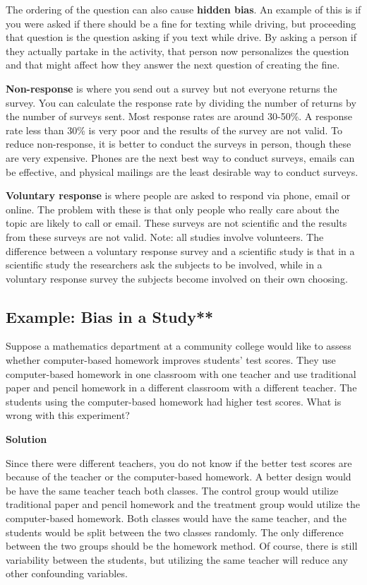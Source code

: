 \documentclass[
]{book}
\begin{document}
The ordering of the question can also cause \textbf{hidden bias}. An example of this is if you were asked if there should be a fine for texting while driving, but proceeding that question is the question asking if you text while drive. By asking a person if they actually partake in the activity, that person now personalizes the question and that might affect how they answer the next question of creating the fine.

\textbf{Non-response} is where you send out a survey but not everyone returns the survey. You can calculate the response rate by dividing the number of returns by the number of surveys sent. Most response rates are around 30-50\%. A response rate less than 30\% is very poor and the results of the survey are not valid. To reduce non-response, it is better to conduct the surveys in person, though these are very expensive. Phones are the next best way to conduct surveys, emails can be effective, and physical mailings are the least desirable way to conduct surveys.

\textbf{Voluntary response} is where people are asked to respond via phone, email or online. The problem with these is that only people who really care about the topic are likely to call or email. These surveys are not scientific and the results from these surveys are not valid. Note: all studies involve volunteers. The difference between a voluntary response survey and a scientific study is that in a scientific study the researchers ask the subjects to be involved, while in a voluntary response survey the subjects become involved on their own choosing.

\hypertarget{example-bias-in-a-study}{%
\subsection{Example: Bias in a Study**}\label{example-bias-in-a-study}}

Suppose a mathematics department at a community college would like to assess whether computer-based homework improves students' test scores. They use computer-based homework in one classroom with one teacher and use traditional paper and pencil homework in a different classroom with a different teacher. The students using the computer-based homework had higher test scores. What is wrong with this experiment?

\textbf{Solution}

Since there were different teachers, you do not know if the better test scores are because of the teacher or the computer-based homework. A better design would be have the same teacher teach both classes. The control group would utilize traditional paper and pencil homework and the treatment group would utilize the computer-based homework. Both classes would have the same teacher, and the students would be split between the two classes randomly. The only difference between the two groups should be the homework method. Of course, there is still variability between the students, but utilizing the same teacher will reduce any other confounding variables.
\end{document}
